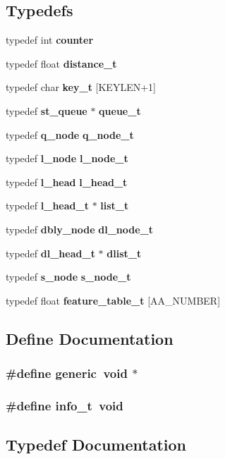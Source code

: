 \subsection*{Typedefs}
\begin{CompactItemize}
\item 
typedef int {\bf counter}
\item 
typedef float {\bf distance\_\-t}
\item 
typedef char {\bf key\_\-t} [KEYLEN+1]
\item 
typedef {\bf st\_\-queue} $\ast$ {\bf queue\_\-t}
\item 
typedef {\bf q\_\-node} {\bf q\_\-node\_\-t}
\item 
typedef {\bf l\_\-node} {\bf l\_\-node\_\-t}
\item 
typedef {\bf l\_\-head} {\bf l\_\-head\_\-t}
\item 
typedef {\bf l\_\-head\_\-t} $\ast$ {\bf list\_\-t}
\item 
typedef {\bf dbly\_\-node} {\bf dl\_\-node\_\-t}
\item 
typedef {\bf dl\_\-head\_\-t} $\ast$ {\bf dlist\_\-t}
\item 
typedef {\bf s\_\-node} {\bf s\_\-node\_\-t}
\item 
typedef float {\bf feature\_\-table\_\-t} [AA\_\-NUMBER]
\end{CompactItemize}


\subsection{Define Documentation}
\subsubsection{\setlength{\rightskip}{0pt plus 5cm}\#define generic\ void $\ast$}\label{P__types_8h_a0}


\subsubsection{\setlength{\rightskip}{0pt plus 5cm}\#define info\_\-t\ void}\label{P__types_8h_a1}




\subsection{Typedef Documentation}
